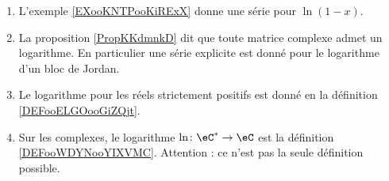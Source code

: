 \begin{enumerate}
    \item
        L'exemple \ref{EXooKNTPooKiRExX} donne une série pour \( \ln(1-x)\).
    \item
        La proposition \ref{PropKKdmnkD} dit que toute matrice complexe admet un logarithme. En particulier une série explicite est donné pour le logarithme d'un bloc de Jordan.
    \item
        Le logarithme pour les réels strictement positifs est donné en la définition \ref{DEFooELGOooGiZQjt}.
    \item
        Sur les complexes, le logarithme \( \ln \colon \eC^*\to \eC\) est la définition \ref{DEFooWDYNooYIXVMC}. Attention : ce n'est pas la seule définition possible.
\end{enumerate}
